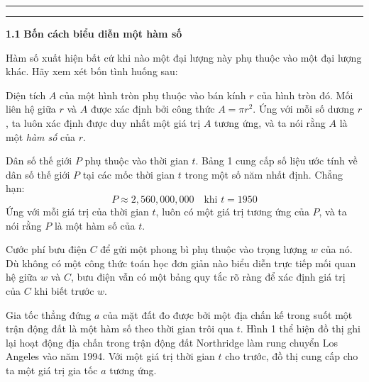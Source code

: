 \documentclass[10pt,letterpaper]{article}
\begin{document}
\begin{minipage}[t]{0.71\textwidth}
    \noindent
    {\color{stewartcyan}\rule{2.2cm}{2.5pt}\hspace{0.2cm}\rule{1.5cm}{1.2pt}}\hspace{0.3cm}%
    {\color{stewartcyan}\Huge\textbf{\textsf{1.1}}}\hspace{0.4cm}%
    {\Huge\textbf{\textsf{Bốn cách biểu diễn một hàm số}}}
    
    \vspace{0.4cm}
    \vspace{0.2cm}

    Hàm số xuất hiện bất cứ khi nào một đại lượng này phụ thuộc vào một đại lượng khác. Hãy xem xét bốn tình huống sau:

    \begin{description}[leftmargin=1.5em, itemsep=0.15cm, topsep=0.15cm]
        \item[\textbf{A.}] Diện tích $A$ của một hình tròn phụ thuộc vào bán kính $r$ của hình tròn đó. Mối liên hệ giữa $r$ và $A$ được xác định bởi công thức $A = \pi r^2$. Ứng với mỗi số dương $r$, ta luôn xác định được duy nhất một giá trị $A$ tương ứng, và ta nói rằng $A$ là một \textit{hàm số} của $r$.

        \item[\textbf{B.}] Dân số thế giới $P$ phụ thuộc vào thời gian $t$. Bảng 1 cung cấp số liệu ước tính về dân số thế giới $P$ tại các mốc thời gian $t$ trong một số năm nhất định. Chẳng hạn:
        \[
        P \approx 2{,}560{,}000{,}000 \quad \text{khi } t = 1950
        \]
        Ứng với mỗi giá trị của thời gian $t$, luôn có một giá trị tương ứng của $P$, và ta nói rằng $P$ là một hàm số của $t$.

        \item[\textbf{C.}] Cước phí bưu điện $C$ để gửi một phong bì phụ thuộc vào trọng lượng $w$ của nó. Dù không có một công thức toán học đơn giản nào biểu diễn trực tiếp mối quan hệ giữa $w$ và $C$, bưu điện vẫn có một bảng quy tắc rõ ràng để xác định giá trị của $C$ khi biết trước $w$.

        \item[\textbf{D.}] Gia tốc thẳng đứng $a$ của mặt đất đo được bởi một địa chấn kế trong suốt một trận động đất là một hàm số theo thời gian trôi qua $t$. Hình 1 thể hiện đồ thị ghi lại hoạt động địa chấn trong trận động đất Northridge làm rung chuyển Los Angeles vào năm 1994. Với một giá trị thời gian $t$ cho trước, đồ thị cung cấp cho ta một giá trị gia tốc $a$ tương ứng.
    \end{description}


\end{minipage}
\end{document}
